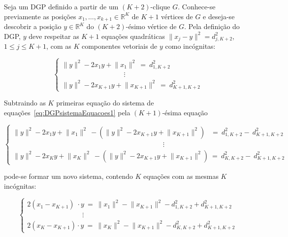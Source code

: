 Seja um DGP definido a partir de um $(K+2)$-clique $G$. Conhece-se previamente as posições $x_1, \dots, x_{k+1} \in \mathbb{R}^{K}$ de $K+1$ vértices de $G$ e deseja-se descobrir a posição $y\in\mathbb{R}^K$ do $(K+2)$-ésimo vértice de $G$. Pela definição do DGP, $y$ deve respeitar as $K+1$ equações quadráticas $\lVert x_j-y\rVert^2 = d_{j,K+2}^2$, $1\leq j\leq K+1$, com as $K$ componentes vetoriais de $y$ como incógnitas:

\begin{equation}
	\begin{cases} 
		\lVert y \rVert^2 -2x_1y + \lVert x_1\rVert^2 \ = \ d^2_{1,K+2}
		\\
		\qquad\qquad\qquad\quad\qquad \!\vdots
		\\
		\lVert y \rVert^2 -2x_{K+1}y + \lVert x_{K+1}\rVert^2 \ = \ d^2_{K+1,K+2}
	\end{cases}
	\label{eq:DGPsistemaEquacoes1}
\end{equation}

Subtraindo as $K$ primeiras equação do sistema de equações~\ref{eq:DGPsistemaEquacoes1} pela $(K+1)$-ésima equação

\begin{equation}
\begin{cases} 
\lVert y \rVert^2 -2x_1y + \lVert x_1\rVert^2 \ - (\lVert y \rVert^2 -2x_{K+1}y + \lVert x_{K+1}\rVert^2 )\; \; \ = \ d^2_{1,K+2} - \ d^2_{K+1,K+2}
\\
\qquad\qquad\qquad\quad\qquad\qquad\qquad\qquad\qquad\quad\qquad\quad \ \; \;\vdots
\\
\lVert y \rVert^2 -2x_Ky + \lVert x_K\rVert^2 \ - (\lVert y \rVert^2 -2x_{K+1}y + \lVert x_{K+1}\rVert^2 )\ = \ d^2_{K,K+2} - \ d^2_{K+1,K+2}
\end{cases}
\label{eq:DGPsistemaEquacoes3}
\end{equation}

pode-se formar um novo sistema, contendo $K$ equações com as mesmas $K$ incógnitas:

\begin{equation}
\begin{cases} 
2(x_1-x_{K+1}) \;\cdot y \ = \ \lVert x_1\rVert^2 - \lVert x_{K+1}\rVert^2 - d^2_{1,K+2} + d^2_{K+1,K+2} 
\\
\qquad\qquad\qquad\qquad\!\!\!\vdots
\\
2(x_{K}-x_{K+1}) \cdot y \ = \ \lVert x_{K}\rVert^2 - \lVert x_{K+1}\rVert^2 - d^2_{K,K+2} + d^2_{K+1,K+2} 
\end{cases}
\label{eq:DGPsistemaEquacoes2}
\end{equation}

